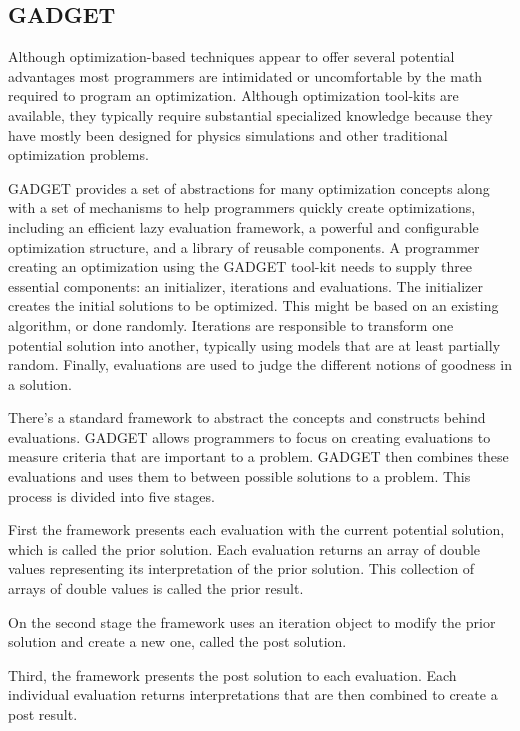 \subsection{GADGET}
\label{subsection:GADGET}

Although optimization-based techniques appear to offer several potential advantages most programmers are intimidated or uncomfortable by the math required to program an optimization. Although optimization tool-kits are available, they typically require substantial specialized knowledge because they have mostly been designed for physics simulations and other traditional optimization problems.

GADGET provides a set of abstractions for many optimization concepts along with a set of mechanisms to help programmers quickly create optimizations, including an efficient lazy evaluation framework, a powerful and configurable optimization structure, and a library of reusable components.
A programmer creating an optimization using the GADGET tool-kit needs to supply three essential components: an initializer, iterations and evaluations. The initializer creates the initial solutions to be optimized. This might be based on an existing algorithm, or done randomly. Iterations are responsible to transform one potential solution into another, typically using models that are at least partially random. Finally, evaluations are used to judge the different notions of goodness in a solution.

There’s a standard framework to abstract the concepts and constructs behind evaluations. GADGET allows programmers to focus on creating evaluations to measure criteria that are important to a problem. GADGET then combines these evaluations and uses them to between possible solutions to a problem. This process is divided into five stages. 

First the framework presents each evaluation with the current potential solution, which is called the prior solution. Each evaluation returns an array of double values representing its interpretation of the prior solution. This collection of arrays of double values is called the prior result. 

On the second stage the framework uses an iteration object to modify the prior solution and create a new one, called the post solution.

Third, the framework presents the post solution to each evaluation. Each individual evaluation returns interpretations that are then combined to create a post result.

